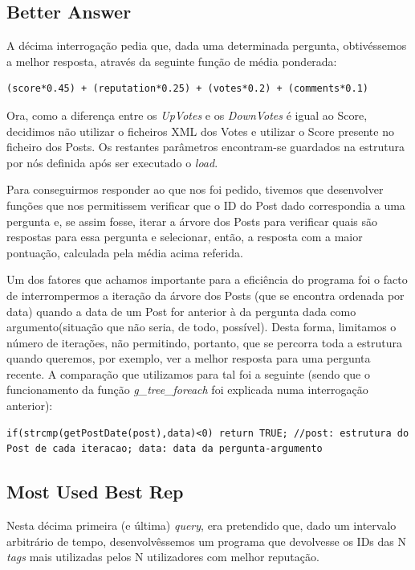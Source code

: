 \documentclass[a4paper, 11pt, oneside]{article}
\begin{document}
\subsection{Better Answer}
A décima interrogação pedia que, dada uma determinada pergunta, obtivéssemos a melhor resposta, através da seguinte função de média ponderada:
\begin{verbatim}
(score*0.45) + (reputation*0.25) + (votes*0.2) + (comments*0.1)
\end{verbatim}
Ora, como a diferença entre os \textit{UpVotes} e os \textit{DownVotes} é igual ao Score, decidimos não utilizar o ficheiros XML dos Votes e utilizar o Score presente no ficheiro dos Posts. Os restantes parâmetros encontram-se guardados na estrutura por nós definida após ser executado o \textit{load}.

Para conseguirmos responder ao que nos foi pedido, tivemos que desenvolver funções que nos permitissem verificar que o ID do Post dado correspondia a uma pergunta e, se assim fosse, iterar a árvore dos Posts para verificar quais são respostas para essa pergunta e selecionar, então, a resposta com a maior pontuação, calculada pela média acima referida.

Um dos fatores que achamos importante para a eficiência do programa foi o facto de interrompermos a iteração da árvore dos Posts (que se encontra ordenada por data) quando a data de um Post for anterior à da pergunta dada como argumento(situação que não seria, de todo, possível). Desta forma, limitamos o número de iterações, não permitindo, portanto, que se percorra toda a estrutura quando queremos, por exemplo, ver a melhor resposta para uma pergunta recente.
A comparação que utilizamos para tal foi a seguinte (sendo que o funcionamento da função \textit{g\_tree\_foreach} foi explicada numa interrogação anterior):
\begin{lstlisting}[caption=Query 10 - interrupção da iteração da árvore]
if(strcmp(getPostDate(post),data)<0) return TRUE; //post: estrutura do Post de cada iteracao; data: data da pergunta-argumento
\end{lstlisting}

\subsection{Most Used Best Rep}
Nesta décima primeira (e última) \textit{query}, era pretendido que, dado um intervalo arbitrário de tempo, desenvolvêssemos um programa que devolvesse os IDs das N \textit{tags} mais utilizadas pelos N utilizadores com melhor reputação.
\end{document}
